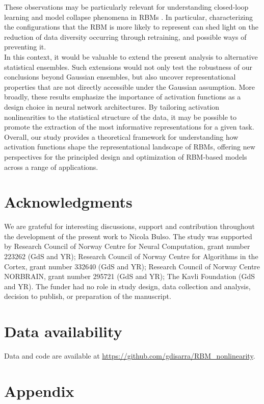 \documentclass[11pt,letterpaper]{article}
\begin{document}
These observations may be particularly relevant for understanding closed-loop learning and model collapse phenomena in RBMs \cite{Jangjoo}. In particular, characterizing the configurations that the RBM is more likely to represent can shed light on the reduction of data diversity occurring through retraining, and possible ways of preventing it. \\
In this context, it would be valuable to extend the present analysis to alternative statistical ensembles. Such extensions would not only test the robustness of our conclusions beyond Gaussian ensembles, but also uncover representational properties that are not directly accessible under the Gaussian assumption. More broadly, these results emphasize the importance of activation functions as a design choice in neural network architectures. By tailoring activation nonlinearities to the statistical structure of the data, it may be possible to promote the extraction of the most informative representations for a given task. Overall, our study provides a theoretical framework for understanding how activation functions shape the representational landscape of RBMs, offering new perspectives for the principled design and optimization of RBM-based models across a range of applications.

\section*{Acknowledgments}
We are grateful for interesting discussions, support and contribution throughout the development of the present work to Nicola Bulso. The study was supported by Research Council of Norway Centre for Neural Computation, grant number 223262 (GdS and YR); Research Council of Norway Centre for Algorithms in the Cortex, grant number 332640 (GdS and YR); Research Council of Norway Centre NORBRAIN, grant number 295721 (GdS and YR); The Kavli Foundation (GdS and YR). The funder had no role in study design, data collection and analysis, decision to publish, or preparation of the manuscript.

\section*{Data availability}
Data and code are available at \url{https://github.com/gdisarra/RBM_nonlinearity}.



 

\newpage
\section*{Appendix}
\appendix
\end{document}
